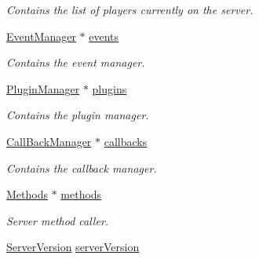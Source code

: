 \begin{DoxyCompactItemize}
\begin{DoxyCompactList}\small\item\em Contains the list of players currently on the server. \end{DoxyCompactList}\item 
\hypertarget{classManiaPP_a326ab543ab98eefcba8a4b616e794b96}{\hyperlink{classEventManager}{Event\-Manager} $\ast$ \hyperlink{classManiaPP_a326ab543ab98eefcba8a4b616e794b96}{events}}\label{classManiaPP_a326ab543ab98eefcba8a4b616e794b96}

\begin{DoxyCompactList}\small\item\em Contains the event manager. \end{DoxyCompactList}\item 
\hypertarget{classManiaPP_a199f7d80431e7f13e52e6010347f644a}{\hyperlink{classPluginManager}{Plugin\-Manager} $\ast$ \hyperlink{classManiaPP_a199f7d80431e7f13e52e6010347f644a}{plugins}}\label{classManiaPP_a199f7d80431e7f13e52e6010347f644a}

\begin{DoxyCompactList}\small\item\em Contains the plugin manager. \end{DoxyCompactList}\item 
\hypertarget{classManiaPP_af468d4b6eea93fd836950551eb7d3a01}{\hyperlink{classCallBackManager}{Call\-Back\-Manager} $\ast$ \hyperlink{classManiaPP_af468d4b6eea93fd836950551eb7d3a01}{callbacks}}\label{classManiaPP_af468d4b6eea93fd836950551eb7d3a01}

\begin{DoxyCompactList}\small\item\em Contains the callback manager. \end{DoxyCompactList}\item 
\hypertarget{classManiaPP_a48cb1ddf328d18361417986fe8ab069c}{\hyperlink{classMethods}{Methods} $\ast$ \hyperlink{classManiaPP_a48cb1ddf328d18361417986fe8ab069c}{methods}}\label{classManiaPP_a48cb1ddf328d18361417986fe8ab069c}

\begin{DoxyCompactList}\small\item\em Server method caller. \end{DoxyCompactList}\item 
\hypertarget{classManiaPP_ae5cc5086f09dcdb6b5d5dd4cb9a5476c}{\hyperlink{structServerVersion}{Server\-Version} \hyperlink{classManiaPP_ae5cc5086f09dcdb6b5d5dd4cb9a5476c}{server\-Version}}\label{classManiaPP_ae5cc5086f09dcdb6b5d5dd4cb9a5476c}


\end{DoxyCompactItemize}
